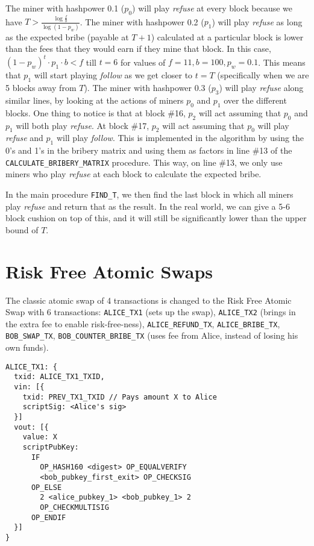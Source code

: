 \documentclass[runningheads]{llncs}
\newcommand{\refuse}{\emph{refuse}}
\newcommand{\follow}{\emph{follow}}
\begin{document}
\begin{subappendices}
The miner with hashpower 0.1 ($p_0$) will play \refuse{} at every block because we have $T > \frac{\log \frac{f}{b}}{\log (1-p_w)}$. The miner with hashpower 0.2 ($p_1$) will play \refuse{} as long as the expected bribe (payable at $T+1$) calculated at a particular block is lower than the fees that they would earn if they mine that block. In this case, $(1- p_w)^t \cdot p_1 \cdot b < f$ till $t = 6$ for values of $f = 11, b = 100, p_w = 0.1$. This means that $p_1$ will start playing \follow{} as we get closer to $t = T$ (specifically when we are 5 blocks away from $T$). The miner with hashpower 0.3 ($p_3$) will play \refuse{} along similar lines, by looking at the actions of miners $p_0$ and $p_1$ over the different blocks. One thing to notice is that at block \#16, $p_2$ will act assuming that $p_0$ and $p_1$ will both play \refuse{}. At block \#17, $p_2$ will act assuming that $p_0$ will play \refuse{} and $p_1$ will play \follow{}. This is implemented in the algorithm by using the 0's and 1's in the bribery matrix and using them as factors in line \#13 of the \texttt{CALCULATE\_BRIBERY\_MATRIX} procedure. This way, on line \#13, we only use miners who play \refuse{} at each block to calculate the expected bribe.

In the main procedure \texttt{FIND\_T}, we then find the last block in which all miners play \refuse{} and return that as the result. In the real world, we can give a 5-6 block cushion on top of this, and it will still be significantly lower than the upper bound of $T$.
\section{Risk Free Atomic Swaps}
\label{appendex:atomic_swap}
The classic atomic swap of 4 transactions is changed to the Risk Free Atomic Swap with 6 transactions: {\texttt{ALICE\_TX1}} (sets up the swap), {\texttt{ALICE\_TX2}} (brings in the extra fee to enable risk-free-ness), {\texttt{ALICE\_REFUND\_TX}}, {\texttt{ALICE\_BRIBE\_TX}}, {\texttt{BOB\_SWAP\_TX}}, {\texttt{BOB\_COUNTER\_BRIBE\_TX}} (uses fee from Alice, instead of losing his own funds).
\begin{lstlisting}
ALICE_TX1: {
  txid: ALICE_TX1_TXID,
  vin: [{
    txid: PREV_TX1_TXID // Pays amount X to Alice
    scriptSig: <Alice's sig>
  }]      
  vout: [{
    value: X
    scriptPubKey: 
      IF
        OP_HASH160 <digest> OP_EQUALVERIFY
        <bob_pubkey_first_exit> OP_CHECKSIG
      OP_ELSE
        2 <alice_pubkey_1> <bob_pubkey_1> 2 
        OP_CHECKMULTISIG
      OP_ENDIF
  }]
}
\end{lstlisting}


\end{subappendices}
\end{document}
